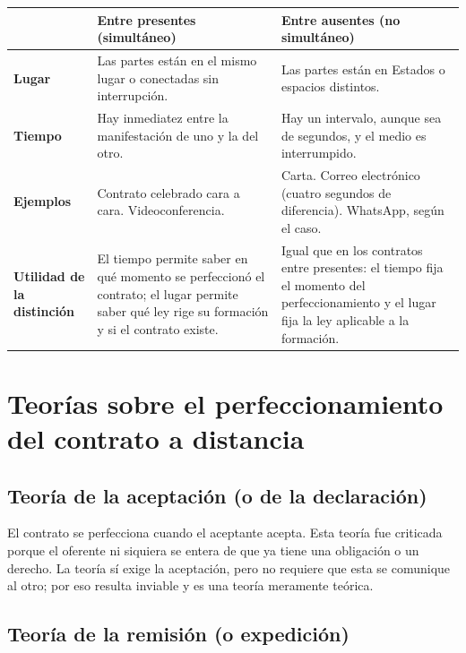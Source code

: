 \documentclass[12pt,oneside]{book}
\begin{document}
\begin{table}[H]
\centering
\small
\begin{tabular}{@{}L{0.16\textwidth}L{0.37\textwidth}L{0.37\textwidth}@{}}
\toprule
 & \textbf{Entre presentes (simultáneo)} & \textbf{Entre ausentes (no simultáneo)} \\
\midrule
\textbf{Lugar} & Las partes están en el mismo lugar o conectadas sin interrupción. & Las partes están en Estados o espacios distintos. \\
\textbf{Tiempo} & Hay inmediatez entre la manifestación de uno y la del otro. & Hay un intervalo, aunque sea de segundos, y el medio es interrumpido. \\
\textbf{Ejemplos} & Contrato celebrado cara a cara. Videoconferencia. & Carta. Correo electrónico (cuatro segundos de diferencia). WhatsApp, según el caso. \\
\textbf{Utilidad de la distinción} & El tiempo permite saber en qué momento se perfeccionó el contrato; el lugar permite saber qué ley rige su formación y si el contrato existe. & Igual que en los contratos entre presentes: el tiempo fija el momento del perfeccionamiento y el lugar fija la ley aplicable a la formación. \\
\bottomrule
\end{tabular}
\end{table}


\section{Teorías sobre el perfeccionamiento del contrato a distancia}

\subsection{Teoría de la aceptación (o de la declaración)}

El contrato se perfecciona cuando el aceptante acepta. Esta teoría fue criticada porque el oferente ni siquiera se entera de que ya tiene una obligación o un derecho. La teoría sí exige la aceptación, pero no requiere que esta se comunique al otro; por eso resulta inviable y es una teoría meramente teórica.

\subsection{Teoría de la remisión (o expedición)}
\end{document}
